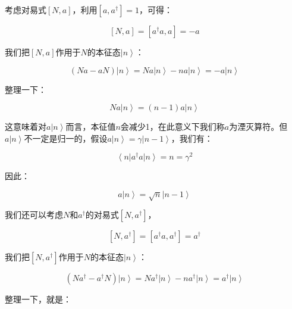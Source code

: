 考虑对易式$\left[ N, a \right]$，利用$\left[ a, a^\dagger \right] = 1$，可得：

\begin{equation*}
\left[ N, a \right]  = \left[ a^\dagger a , a \right] = - a
\end{equation*}

我们把$\left[ N, a \right] $作用于$N$的本征态$\left| n \right\rangle$：

\begin{equation*}
\left( N a - a N \right) \left| n \right\rangle = N a \left| n \right\rangle - n a \left| n \right\rangle = - a \left| n \right\rangle
\end{equation*}

整理一下：

\begin{equation}
N a \left| n \right\rangle = (n -1) a \left| n \right\rangle
\end{equation}

这意味着对$a \left| n \right\rangle$而言，本征值$n$会减少1，在此意义下我们称$a$为湮灭算符。但$a \left| n \right\rangle$不一定是归一的，假设$a \left| n \right\rangle = \gamma \left| n -1 \right\rangle$，我们有：

\begin{equation*}
\left\langle n \right| a^\dagger a \left| n \right\rangle = n = \gamma^2
\end{equation*}

因此：

\begin{equation}
a \left| n \right\rangle = \sqrt{n} \left| n -1 \right\rangle
\end{equation}

我们还可以考虑$N$和$a^\dagger$的对易式$\left[ N, a^\dagger \right]$，

\begin{equation*}
\left[ N, a^\dagger \right] = \left[ a^\dagger a , a^\dagger \right] = a^\dagger
\end{equation*}

我们把$\left[ N, a^\dagger \right] $作用于$N$的本征态$\left| n \right\rangle$：

\begin{equation*}
\left( N a^\dagger - a^\dagger N \right) \left| n \right\rangle =   N a^\dagger \left| n \right\rangle - n a^\dagger \left| n \right\rangle = a^\dagger \left| n \right\rangle 
\end{equation*}

整理一下，就是：


